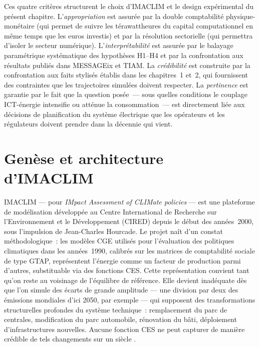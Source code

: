 Ces quatre critères structurent le choix d'IMACLIM et le design expérimental du présent chapitre. L'\emph{appropriation} est assurée par la double comptabilité physique-monétaire (qui permet de suivre les térawattheures du capital computationnel en même temps que les euros investis) et par la résolution sectorielle (qui permettra d'isoler le secteur numérique). L'\emph{interprétabilité} est assurée par le balayage paramétrique systématique des hypothèses H1--H4 et par la confrontation aux résultats publiés dans MESSAGEix et TIAM. La \emph{crédibilité} est construite par la confrontation aux faits stylisés établis dans les chapitres~1 et~2, qui fournissent des contraintes que les trajectoires simulées doivent respecter. La \emph{pertinence} est garantie par le fait que la question posée~--- sous quelles conditions le couplage ICT-énergie intensifie ou atténue la consommation~--- est directement liée aux décisions de planification du système électrique que les opérateurs et les régulateurs doivent prendre dans la décennie qui vient.


\section{Genèse et architecture d'IMACLIM}\label{sec:imaclim-architecture}

IMACLIM --- pour \emph{IMpact Assessment of CLIMate policies} --- est une plateforme de modélisation développée au Centre International de Recherche sur l'Environnement et le Développement (CIRED) depuis le début des années~2000, sous l'impulsion de Jean-Charles Hourcade. Le projet naît d'un constat méthodologique~: les modèles CGE utilisés pour l'évaluation des politiques climatiques dans les années~1990, calibrés sur les matrices de comptabilité sociale de type GTAP, représentent l'énergie comme un facteur de production parmi d'autres, substituable via des fonctions CES. Cette représentation convient tant qu'on reste au voisinage de l'équilibre de référence. Elle devient inadéquate dès que l'on simule des écarts de grande amplitude --- une division par deux des émissions mondiales d'ici 2050, par exemple --- qui supposent des transformations structurelles profondes du système technique~: remplacement du parc de centrales, modification du parc automobile, rénovation du bâti, déploiement d'infrastructures nouvelles. Aucune fonction CES ne peut capturer de manière crédible de tels changements sur un siècle \parencite{hourcade_modelling_1993}.

